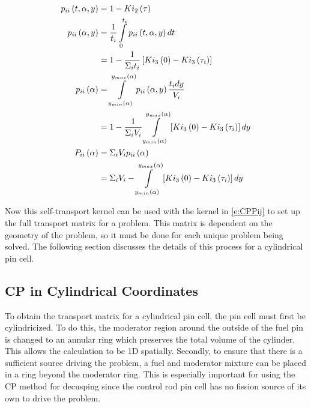 \begin{subequations}\label{e:CPPii}
  \begin{align}
  p_{ii}\left(t,\alpha,y\right) &= 1 - Ki_2\left(\tau\right) \\
  p_{ii}\left(\alpha,y\right) &= \frac{1}{t_i} \intop_0^{t_i} p_{ii}\left(t,\alpha,y\right) dt \nonumber \\
  &= 1- \frac{1}{\Sigma_i t_i} \left[Ki_3\left(0\right) - Ki_3\left(\tau_i\right)\right] \\
  p_{ii}\left(\alpha\right) &= \intop_{y_{min}\left(\alpha\right)}^{y_{max}\left(\alpha\right)} p_{ii}\left(\alpha,y\right) \frac{t_i dy}{V_i} \nonumber\\
  &= 1 - \frac{1}{\Sigma_i V_i} \intop_{y_{min}\left(\alpha\right)}^{y_{max}\left(\alpha\right)} \left[Ki_3\left(0\right) - Ki_3\left(\tau_i\right)\right] dy \\
  P_{ii}\left(\alpha\right) &= \Sigma_i V_i p_{ii}\left(\alpha\right) \nonumber \\
  &= \Sigma_i V_i - \intop_{y_{min}\left(\alpha\right)}^{y_{max}\left(\alpha\right)} \left[Ki_3\left(0\right) - Ki_3\left(\tau_i\right)\right] dy
  \end{align}
\end{subequations}

Now this self-transport kernel can be used with the kernel in \ref{e:CPPij} to set up the full transport matrix for a problem.  This matrix is dependent on the geometry of the problem, so it must be done for each unique problem being solved.  The following section discusses the details of this process for a cylindrical pin cell.

\subsection{CP in Cylindrical Coordinates}\label{appsubsec:CPcylCoord}

To obtain the transport matrix for a cylindrical pin cell, the pin cell must first be cylindricized.  To do this, the moderator region around the outside of the fuel pin is changed to an annular ring which preserves the total volume of the cylinder.  This allows the calculation to be 1D spatially.  Secondly, to ensure that there is a sufficient source driving the problem, a fuel and moderator mixture can be placed in a ring beyond the moderator ring.  This is especially important for using the CP method for decusping since the control rod pin cell has no fission source of its own to drive the problem.

